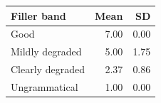 \begin{table}[H]
\centering
\begin{tabular}{@{}l r r@{}}
\toprule
Filler band & Mean & SD \\
\midrule
Good          & 7.00 & 0.00 \\
Mildly degraded & 5.00 & 1.75 \\
Clearly degraded & 2.37 & 0.86 \\
Ungrammatical   & 1.00 & 0.00 \\
\bottomrule
\end{tabular}
\end{table}
